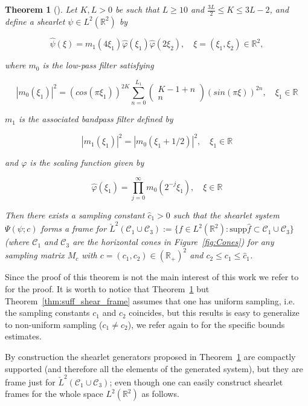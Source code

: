 \documentclass[a4paper]{article}
\newtheorem{theorem}{Theorem}
\begin{document}
\begin{theorem}[\cite{ConstructCompactShear}]
\label{thm:compact_shear_construct}
Let $K,L>0$ be such that $L\geq 10$ and $\frac{3L}{2}\leq K\leq 3L-2$, and define a shearlet $\psi\in L^2(\mathbb{R}^2)$ by

$$
\hat{\psi}(\xi)=m_1(4\xi_1)\hat{\varphi}(\xi_1)\hat{\varphi}(2\xi_2), \quad \xi=(\xi_1,\xi_2)\in\mathbb{R}^2,
$$

where $m_0$ is the low-pass filter satisfying

$$
|m_0(\xi_1)|^2=(cos(\pi\xi_1))^{2K}\sum_{n=0}^{L_1}\left( \begin{matrix} K-1+n \\ n \end{matrix}\right)(sin(\pi\xi))^{2n}, \quad \xi_1\in\mathbb{R}
$$

$m_1$ is the associated bandpass filter defined by

$$
|m_1(\xi_1)|^2=|m_0(\xi_1+1/2)|^2, \quad \xi_1\in\mathbb{R}
$$

and $\varphi$ is the scaling function given by

$$
\hat{\varphi}(\xi_1)=\prod_{j=0}^{\infty}m_0(2^{-j}\xi_1), \quad \xi\in\mathbb{R}
$$

Then there exists a sampling constant $\hat{c}_1>0$ such that the shearlet system $\Psi(\psi;c)$ forms a frame for $\check{L}^2(\mathcal{C}_1\cup\mathcal{C}_3):=\{f\in L^2(\mathbb{R}^2): \text{supp} \hat{f}\subset \mathcal{C}_1\cup\mathcal{C}_3\}$ (where $\mathcal{C}_1$ and $\mathcal{C}_3$ are the horizontal cones in Figure~\ref{fig:Cones}) for any sampling matrix $M_c$ with $c=(c_1,c_2)\in (\mathbb{R}_+)^2$ and $c_2\leq c_1\leq \hat{c}_1$.
\end{theorem}

\bigskip

Since the proof of this theorem is not the main interest of this work we refer to \cite{ConstructCompactShear} for the proof. It is worth to notice that Theorem~\ref{thm:compact_shear_construct} but Theorem~\ref{thm:suff_shear_frame} assumes that one has uniform sampling, i.e. the sampling constants $c_1$ and $c_2$ coincides, but this results is easy to generalize to non-uniform sampling ($c_1\neq c_2$), we refer again to \cite{ConstructCompactShear} for the specific bounds estimates.

\bigskip

By construction the shearlet generators proposed in Theorem~\ref{thm:compact_shear_construct} are compactly supported (and therefore all the elements of the generated system), but they are frame just for $\check{L}^2(\mathcal{C}_1\cup\mathcal{C}_3)$; even though one can easily construct shearlet frames for the whole space $L^2(\mathbb{R}^2)$ as follows.
\end{document}

